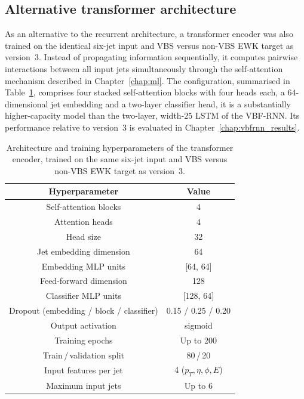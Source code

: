 \subsection{Alternative transformer architecture}

As an alternative to the recurrent architecture, a transformer encoder was also trained on the identical six-jet input and VBS versus non-VBS EWK target as version~3. Instead of propagating information sequentially, it computes pairwise interactions between all input jets simultaneously through the self-attention mechanism described in Chapter~\ref{chap:ml}. The configuration, summarised in Table~\ref{tab:transformer_hyperparams}, comprises four stacked self-attention blocks with four heads each, a $64$-dimensional jet embedding and a two-layer classifier head, it is a substantially higher-capacity model than the two-layer, width-$25$ LSTM of the VBF-RNN. Its performance relative to version~3 is evaluated in Chapter~\ref{chap:vbfrnn_results}.

\begin{table}[htbp]
  \centering
  \caption{Architecture and training hyperparameters of the transformer encoder, trained on the same six-jet input and VBS versus non-VBS EWK target as version~3.}
  \label{tab:transformer_hyperparams}
  \begin{tabular}{|c|c|}
    \hline
    \textbf{Hyperparameter} & \textbf{Value} \\
    \hline
    Self-attention blocks                       & 4 \\
    Attention heads                             & 4 \\
    Head size                                   & 32 \\
    Jet embedding dimension                     & 64 \\
    Embedding MLP units                         & [64, 64] \\
    Feed-forward dimension                      & 128 \\
    Classifier MLP units                        & [128, 64] \\
    Dropout (embedding / block / classifier)    & 0.15 / 0.25 / 0.20 \\
    Output activation                           & sigmoid \\
    Training epochs                             & Up to 200\\
    Train\,/\,validation split                  & 80\,/\,20 \\
    Input features per jet                      & 4 ($p_T,\eta,\phi,E$) \\
    Maximum input jets                          & Up to 6 \\
    \hline
  \end{tabular}
\end{table}

